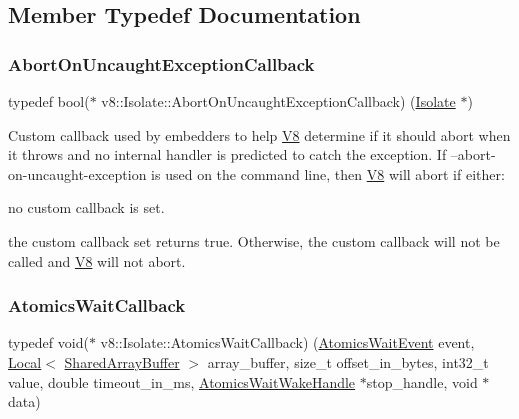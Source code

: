 \subsection{Member Typedef Documentation}
\mbox{\label{classv8_1_1Isolate_aeb1d49e500d9521b42743a6a740271e2}} 
\subsubsection{\texorpdfstring{Abort\+On\+Uncaught\+Exception\+Callback}{AbortOnUncaughtExceptionCallback}}
{\footnotesize\ttfamily typedef bool($\ast$ v8\+::\+Isolate\+::\+Abort\+On\+Uncaught\+Exception\+Callback) (\mbox{\hyperlink{classv8_1_1Isolate}{Isolate}} $\ast$)}

Custom callback used by embedders to help \mbox{\hyperlink{classv8_1_1V8}{V8}} determine if it should abort when it throws and no internal handler is predicted to catch the exception. If --abort-\/on-\/uncaught-\/exception is used on the command line, then \mbox{\hyperlink{classv8_1_1V8}{V8}} will abort if either\+:
\begin{DoxyItemize}
\item no custom callback is set.
\item the custom callback set returns true. Otherwise, the custom callback will not be called and \mbox{\hyperlink{classv8_1_1V8}{V8}} will not abort. 
\end{DoxyItemize}\mbox{\label{classv8_1_1Isolate_a94e0b85c927b71a6501d73c68a454758}} 
\subsubsection{\texorpdfstring{Atomics\+Wait\+Callback}{AtomicsWaitCallback}}
{\footnotesize\ttfamily typedef void($\ast$ v8\+::\+Isolate\+::\+Atomics\+Wait\+Callback) (\mbox{\hyperlink{classv8_1_1Isolate_aa4cfd46a1a22b1ec8fd061c7bbb8b331}{Atomics\+Wait\+Event}} event, \mbox{\hyperlink{classv8_1_1Local}{Local}}$<$ \mbox{\hyperlink{classv8_1_1SharedArrayBuffer}{Shared\+Array\+Buffer}} $>$ array\+\_\+buffer, size\+\_\+t offset\+\_\+in\+\_\+bytes, int32\+\_\+t value, double timeout\+\_\+in\+\_\+ms, \mbox{\hyperlink{classv8_1_1Isolate_1_1AtomicsWaitWakeHandle}{Atomics\+Wait\+Wake\+Handle}} $\ast$stop\+\_\+handle, void $\ast$data)}


